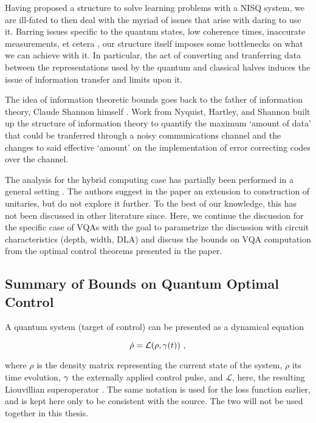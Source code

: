 
Having proposed a structure to solve learning problems with a NISQ system, we
are ill-fated to then deal with the myriad of issues that arise with daring to
use it. Barring issues specific to the quantum states, low coherence times,
inaccurate measurements, et cetera , our structure itself
imposes some bottlenecks on what we can achieve with it. In particular, the act
of converting and tranferring data between the representations used by the
quantum and classical halves induces the issue of information transfer and
limits upon it. 

The idea of information theoretic bounds goes back to the father of information
theory, Claude Shannon himself . Work from Nyquist, Hartley,
and Shannon  built up the structure of information theory to
quantify the maximum `amount of data' that could be tranferred through a noisy
communications channel and the changes to said effective `amount' on the
implementation of error correcting codes over the channel.

The analysis for the hybrid computing case has partially been performed in a
general setting \cite{lloyd2014information}. The authors suggest in the paper an
extension to construction of unitaries, but do not explore it further. To the
best of our knowledge, this has not been discussed in other literature since.
Here, we continue the discussion for the specific case of VQAs with the goal to
parametrize the discussion with circuit characteristics (depth, width, DLA) and
discuss the bounds on VQA computation from the optimal control theorems
presented in the paper.

\subsection{Summary of Bounds on Quantum Optimal Control}
A quantum system (target of control) can be presented as a dynamical equation

\begin{equation}
    \dot{\rho} = \mathcal{L}(\rho, \gamma(t))~,
\end{equation}

where \(\rho\) is the density matrix representing the current state of the
system, \(\dot{\rho}\) its time evolution, \(\gamma\) the externally
applied control pulse, and \(\mathcal{L}\), here, the resulting Liouvillian
superoperator \cite[see][section IV]{manzano2020lindblad}. The same notation is
used for the loss function earlier, and is kept here only to be consistent with
the source. The two will not be used together in this thesis.

